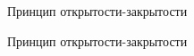 \documentclass[10pt,pdf,hyperref={unicode}]{beamer}%
\begin{document}
\begin{frame}{Принцип открытости-закрытости}
\begin{figure}[h]
\end{figure}
\end{frame}


\begin{frame}{Принцип открытости-закрытости}
\begin{figure}[h]
\end{figure}
\end{frame}
\end{document}
